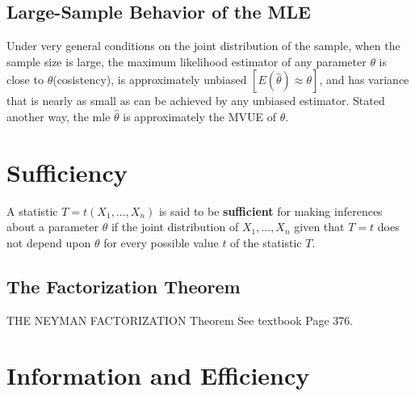\subsection{Large-Sample Behavior of the MLE}

\begin{proposition}
    Under very general conditions on the joint distribution of the sample, when the sample size is large, the maximum likelihood estimator of any parameter $\theta$ is close to $\theta$(cosistency), is approximately unbiased $[E(\hat{\theta})\approx \theta]$, and has variance that is nearly as small as can be achieved by any unbiased estimator. Stated another way, the mle $\hat{\theta}$ is approximately the MVUE of $\theta$.
\end{proposition}

\section{Sufficiency}

\begin{definition}
    A statistic $T = t(X_1,\dots,X_n)$ is said to be \textbf{sufficient} for making inferences about a parameter $\theta$ if the joint distribution of $X_1,\dots,X_n$ given that $T=t$ does not depend upon $\theta$ for every possible value $t$ of the statistic $T$.
\end{definition}

\subsection{The Factorization Theorem}

\begin{theorem}{THE NEYMAN FACTORIZATION Theorem}
    See textbook Page 376.
\end{theorem}

\section{Information and Efficiency}

